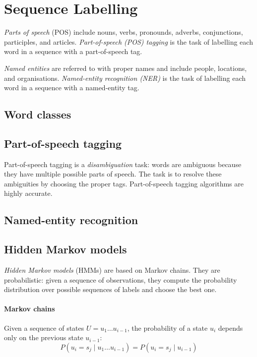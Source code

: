 \section{Sequence Labelling}

\textit{Parts of speech} (POS) include nouns, verbs, pronounds, adverbs,
conjunctions, participles, and articles.
\textit{Part-of-speech (POS) tagging} is the task of labelling each word in a
sequence with a part-of-speech tag.

\textit{Named entities} are referred to with proper names and include people,
locations, and organisations.
\textit{Named-entity recognition (NER)} is the task of labelling each word in a
sequence with a named-entity tag.

\subsection{Word classes}

\subsection{Part-of-speech tagging}

Part-of-speech tagging is a \textit{disambiguation} task: words are ambiguous
because they have multiple possible parts of speech.
The task is to resolve these ambiguities by choosing the proper tags.
Part-of-speech tagging algorithms are highly accurate.

\subsection{Named-entity recognition}

\subsection{Hidden Markov models}

\textit{Hidden Markov models} (HMMs) are based on Markov chains.
They are probabilistic: given a sequence of observations, they compute the
probability distribution over possible sequences of labels and choose the best
one.

\paragraph{Markov chains}

\begin{dfn}
  \label{dfn:8:markov-assumption}
  Given a sequence of states $U = u_1 \dots u_{i - 1}$, the probability of a
  state $u_i$ depends only on the previous state $u_{i - 1}$:
  \begin{equation}
    P(u_i = s_j \mid u_1 \dots u_{i - 1}) = P(u_i = s_j \mid u_{i - 1})
  \end{equation}
\end{dfn}

